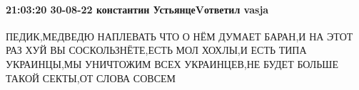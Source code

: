  
 
 
 
 

\paragraph{21:03:20 30-08-22 константин УстьянцеVответил vasja}

ПЕДИК,МЕДВЕДЮ НАПЛЕВАТЬ ЧТО О НЁМ ДУМАЕТ БАРАН,И НА ЭТОТ РАЗ ХУЙ ВЫ
СОСКОЛЬЗНЁТЕ,ЕСТЬ МОЛ ХОХЛЫ,И ЕСТЬ ТИПА УКРАИНЦЫ,МЫ УНИЧТОЖИМ ВСЕХ УКРАИНЦЕВ,НЕ
БУДЕТ БОЛЬШЕ ТАКОЙ СЕКТЫ,ОТ СЛОВА СОВСЕМ
